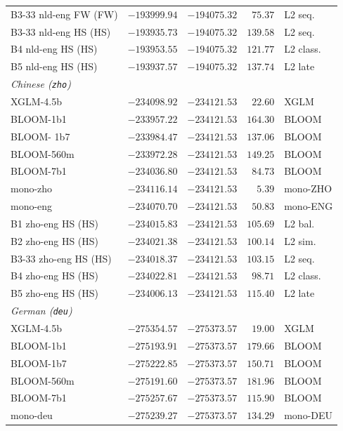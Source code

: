\documentclass[11pt]{article}
\begin{document}
\begin{table}[!ht]
\begin{tabular}{lrrrl}
    B3-33 nld-eng FW (FW) & $-193999.94$ & $-194075.32$ & $75.37$ & L2 seq. \\
    B3-33 nld-eng HS (HS) & $-193935.73$ & $-194075.32$ & $139.58$ & L2 seq. \\
    B4 nld-eng HS (HS) & $-193953.55$ & $-194075.32$ & $121.77$ & L2 class. \\
    B5 nld-eng HS (HS) & $-193937.57$ & $-194075.32$ & $137.74$ & L2 late \\
    \midrule
    \multicolumn{5}{l}{\textit{Chinese (\texttt{zho})}} \\
    \midrule
    XGLM-4.5b & $-234098.92$ & $-234121.53$ & $22.60$ & XGLM \\
    BLOOM-1b1 & $-233957.22$ & $-234121.53$ & $164.30$ & BLOOM \\
    BLOOM- 1b7 & $-233984.47$ & $-234121.53$ & $137.06$ & BLOOM \\
    BLOOM-560m & $-233972.28$ & $-234121.53$ & $149.25$ & BLOOM \\
    BLOOM-7b1 & $-234036.80$ & $-234121.53$ & $84.73$ & BLOOM \\
    mono-zho & $-234116.14$ & $-234121.53$ & $5.39$ & mono-ZHO \\
    mono-eng & $-234070.70$ & $-234121.53$ & $50.83$ & mono-ENG \\
    B1 zho-eng HS (HS) & $-234015.83$ & $-234121.53$ & $105.69$ & L2 bal. \\
    B2 zho-eng HS (HS) & $-234021.38$ & $-234121.53$ & $100.14$ & L2 sim. \\
    B3-33 zho-eng HS (HS) & $-234018.37$ & $-234121.53$ & $103.15$ & L2 seq. \\
    B4 zho-eng HS (HS) & $-234022.81$ & $-234121.53$ & $98.71$ & L2 class. \\
    B5 zho-eng HS (HS) & $-234006.13$ & $-234121.53$ & $115.40$ & L2 late \\
    \midrule
    \multicolumn{5}{l}{\textit{German (\texttt{deu})}} \\
    \midrule
    XGLM-4.5b & $-275354.57$ & $-275373.57$ & $19.00$ & XGLM \\
    BLOOM-1b1 & $-275193.91$ & $-275373.57$ & $179.66$ & BLOOM \\
    BLOOM-1b7 & $-275222.85$ & $-275373.57$ & $150.71$ & BLOOM \\
    BLOOM-560m & $-275191.60$ & $-275373.57$ & $181.96$ & BLOOM \\
    BLOOM-7b1 & $-275257.67$ & $-275373.57$ & $115.90$ & BLOOM \\
    mono-deu & $-275239.27$ & $-275373.57$ & $134.29$ & mono-DEU \\

\end{tabular}
\end{table}
\end{document}
